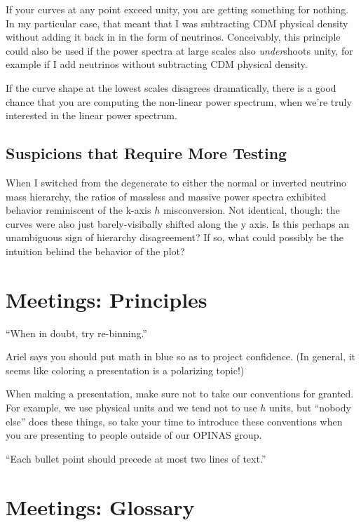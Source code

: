 \documentclass[11pt]{article}
\begin{document}
        If your curves at any point exceed unity, you are getting something for
        nothing. In my particular case, that  meant that I was subtracting CDM
        physical density without adding it back in in the form of neutrinos.
        Conceivably, this principle could also be used if the power spectra at
        large scales also \textit{under}shoots unity, for example if I add
        neutrinos without subtracting CDM physical density.

        If the curve shape at the lowest scales disagrees dramatically, there
        is a good chance that you are computing the non-linear power spectrum,
        when we're truly interested in the linear power spectrum.

    \subsection{Suspicions that Require More Testing}

        When I switched from the degenerate to either the normal or inverted
        neutrino mass hierarchy, the ratios of massless and massive power
        spectra exhibited behavior reminiscent of the k-axis $h$ misconversion.
        Not identical, though: the curves were also just barely-visibally
        shifted along the y axis. Is this perhaps an unambiguous sign of
        hierarchy disagreement? If so, what could possibly be the intuition
        behind the behavior of the plot?


\section{Meetings: Principles}

``When in doubt, try re-binning.''

Ariel says you should put math in blue so as to project confidence. (In
general, it seems like coloring a presentation is a polarizing topic!)

When making a presentation, make sure not to take our conventions for granted.
For example, we use physical units and we tend not to use $h$ units, but
``nobody else'' does these things, so take your time to introduce these
conventions when you are presenting to people outside of our OPINAS group.

``Each bullet point should precede at most two lines of text.''

\section{Meetings: Glossary}
\end{document}
